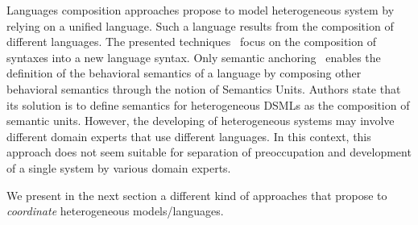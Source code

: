 Languages composition approaches propose to model heterogeneous system by relying on a unified language. Such a language results from the composition of different languages. The presented techniques~\cite{metamodelcompo} focus on the composition of syntaxes into a new language syntax. Only semantic anchoring~\cite{semanticsanchoring} enables the definition of the behavioral semantics of a language by composing other behavioral semantics through the notion of Semantics Units. Authors state that its solution is to define semantics for heterogeneous DSMLs as the composition of semantic units. However, the developing of heterogeneous systems may involve different domain experts that use different languages. In this context, this approach does not seem suitable for separation of preoccupation and development of a single system by various domain experts.

We present in the next section a different kind of approaches that propose to \emph{coordinate} heterogeneous models/languages. 




